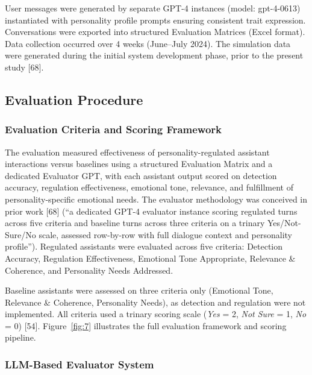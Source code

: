 User messages were generated by separate GPT-4 instances (model: gpt-4-0613) instantiated with personality profile prompts ensuring consistent trait expression. Conversations were exported into structured Evaluation Matrices (Excel format). Data collection occurred over 4 weeks (June--July 2024). The simulation data were generated during the initial system development phase, prior to the present study {[}68{]}.

\subsection{Evaluation Procedure}\label{evaluation-procedure}

\subsubsection{Evaluation Criteria and Scoring Framework}\label{evaluation-criteria-and-scoring-framework}

The evaluation measured effectiveness of personality-regulated assistant interactions versus baselines using a structured Evaluation Matrix and a dedicated Evaluator GPT, with each assistant output scored on detection accuracy, regulation effectiveness, emotional tone, relevance, and fulfillment of personality-specific emotional needs. The evaluator methodology was conceived in prior work {[}68{]} (``a dedicated GPT-4 evaluator instance scoring regulated turns across five criteria and baseline turns across three criteria on a trinary Yes/Not-Sure/No scale, assessed row-by-row with full dialogue context and personality profile''). Regulated assistants were evaluated across five criteria: Detection Accuracy, Regulation Effectiveness, Emotional Tone Appropriate, Relevance \& Coherence, and Personality Needs Addressed.

Baseline assistants were assessed on three criteria only (Emotional Tone, Relevance \& Coherence, Personality Needs), as detection and regulation were not implemented. All criteria used a trinary scoring scale (\textit{Yes} = 2, \textit{Not Sure} = 1, \textit{No} = 0) {[}54{]}. Figure~\ref{fig:7} illustrates the full evaluation framework and scoring pipeline.



\subsubsection{LLM-Based Evaluator System}\label{llm-based-evaluator-system}

